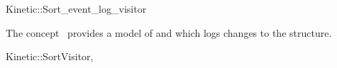

\begin{ccRefClass}{Kinetic::Sort_event_log_visitor}


\ccDefinition
  
The concept \ccRefName\ provides a model of
 and  which logs changes to the structure.

\ccIsModel

Kinetic::SortVisitor, 

\ccSeeAlso



\end{ccRefClass}


